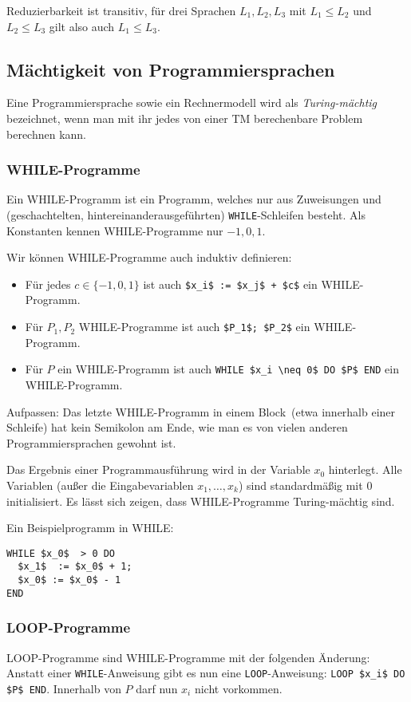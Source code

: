 \documentclass[a4paper,parskip=half*,DIV=7,fontsize=11pt]{scrartcl}
\begin{document}
Reduzierbarkeit ist transitiv, für drei Sprachen $L_1,L_2,L_3$ mit $L_1\leq L_2$ und $L_2 \leq L_3$ gilt also auch $L_1\leq L_3$.

\subsection{Mächtigkeit von Programmiersprachen}
Eine Programmiersprache sowie ein Rechnermodell wird als \emph{Turing-mächtig} bezeichnet, wenn man mit ihr jedes von einer TM berechenbare Problem berechnen kann.

\subsubsection{WHILE-Programme}
Ein  WHILE-Programm  ist ein Programm, welches nur aus Zuweisungen und  (geschachtelten, hintereinanderausgeführten) \lstinline{WHILE}-Schleifen besteht. Als Konstanten kennen WHILE-Programme nur $-1, 0, 1$. 

Wir können WHILE-Programme auch induktiv definieren:
\begin{itemize}
\item Für jedes $c \in \{-1, 0, 1\}$ ist auch \lstinline{$x_i$ := $x_j$ + $c$} ein WHILE-Programm.
\item Für $P_1, P_2$ WHILE-Programme ist auch \lstinline{$P_1$; $P_2$} ein WHILE-Programm.
\item Für $P$ ein WHILE-Programm ist auch \lstinline{WHILE $x_i \neq 0$ DO $P$ END} ein WHILE-Programm.
\end{itemize}

Aufpassen: Das letzte WHILE-Programm in einem \glqq Block\grqq\ (etwa innerhalb einer Schleife) hat kein Semikolon am Ende, wie man es von vielen anderen Programmiersprachen gewohnt ist.

Das Ergebnis einer Programmausführung wird in der Variable $x_0$ hinterlegt. Alle Variablen (außer die Eingabevariablen $x_1,\ldots,x_k$) sind standardmäßig mit $0$ initialisiert. Es lässt sich zeigen, dass  WHILE-Programme Turing-mächtig sind.

Ein Beispielprogramm in WHILE:

\begin{lstlisting}
WHILE $x_0$  > 0 DO
  $x_1$  := $x_0$ + 1;
  $x_0$ := $x_0$ - 1
END
\end{lstlisting}

\subsubsection{LOOP-Programme}
LOOP-Programme sind WHILE-Programme mit der folgenden Änderung: Anstatt einer \lstinline{WHILE}-Anweisung gibt es nun eine \lstinline{LOOP}-Anweisung: \lstinline{LOOP $x_i$ DO $P$ END}. Innerhalb von $P$ darf nun $x_i$ nicht vorkommen.
\end{document}
